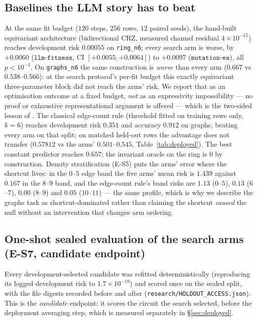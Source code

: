 \documentclass[11pt]{article}
\begin{document}
\subsection{Baselines the LLM story has to beat}
\label{sec:baselines}

At the same fit budget ($120$ steps, $256$ rows, $12$ paired seeds), the hand-built
equivariant architecture (bidirectional CRZ, measured channel residual $4\times10^{-15}$)
reaches development risk $0.00055$ on \texttt{ring\_n6}; every search arm is worse, by
$+0.0060$ ($\texttt{llm-fitness}$, CI $[+0.0055,+0.0064]$) to $+0.0097$
($\texttt{mutation-ea}$), all $p<10^{-4}$. On \texttt{graphs\_n6} the same construction is
\emph{worse} than every arm ($0.667$ vs $0.538$--$0.566$): at the search protocol's per-fit
budget this exactly equivariant three-parameter block did not reach the arms' risk. We report
that as an optimisation outcome at a fixed budget, \emph{not} as an expressivity impossibility
--- no proof or exhaustive representational argument is offered --- which is the two-sided
lesson of \cite{baumann2026}. The classical edge-count rule (threshold fitted on training rows only,
$k{=}6$) reaches development risk $0.351$ and accuracy $0.912$ on graphs, beating every arm on
that split; on matched held-out rows the advantage does not transfer
($0.57812$ vs the arms' $0.501$--$0.545$, Table~\ref{tab:deployed}).
The best constant predictor reaches $0.657$; the invariant oracle on the ring is $0$ by
construction. Density stratification (E-S5) puts the arms' error where the shortcut lives:
in the $0$--$5$ edge band the five arms' mean risk is $1.439$ against $0.167$ in the
$8$--$9$ band, and the edge-count rule's band risks are $1.13$ ($0$--$5$), $0.13$ ($6$--$7$),
$0.00$ ($8$--$9$) and $0.05$ ($10$--$11$) --- the same profile, which is
why we describe the graphs task as shortcut-dominated rather than claiming the shortcut
\emph{caused} the null without an intervention that changes arm ordering.

\subsection{One-shot sealed evaluation of the search arms (E-S7, candidate endpoint)}
\label{sec:holdout}

Every development-selected candidate was refitted deterministically (reproducing its logged
development risk to $1.7\times10^{-18}$) and scored once on the sealed split, with the file
digests recorded before and after (\texttt{research/HOLDOUT\_ACCESS.json}). This is the
\emph{candidate} endpoint: it scores the circuit the search selected, before the deployment
averaging step, which is measured separately in \S\ref{sec:deployed}.
\end{document}
